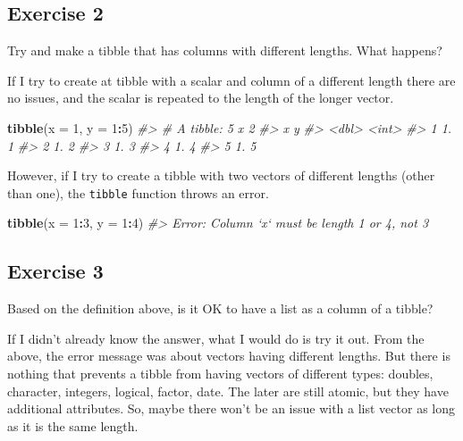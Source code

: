 \documentclass[]{book}
\newenvironment{Shaded}{\begin{snugshade}}{\end{snugshade}}
\newcommand{\CommentTok}[1]{\textcolor[rgb]{0.56,0.35,0.01}{\textit{#1}}}
\newcommand{\DataTypeTok}[1]{\textcolor[rgb]{0.13,0.29,0.53}{#1}}
\newcommand{\DecValTok}[1]{\textcolor[rgb]{0.00,0.00,0.81}{#1}}
\newcommand{\KeywordTok}[1]{\textcolor[rgb]{0.13,0.29,0.53}{\textbf{#1}}}
\newcommand{\NormalTok}[1]{#1}
\newcommand{\OperatorTok}[1]{\textcolor[rgb]{0.81,0.36,0.00}{\textbf{#1}}}
\theoremstyle{definition}
\theoremstyle{definition}
\theoremstyle{definition}
\theoremstyle{remark}
\begin{document}
\hypertarget{exercise-2-50}{%
\subsection{Exercise 2}\label{exercise-2-50}}

Try and make a tibble that has columns with different lengths. What
happens?

If I try to create at tibble with a scalar and column of a different
length there are no issues, and the scalar is repeated to the length of
the longer vector.

\begin{Shaded}
\begin{Highlighting}[]
\KeywordTok{tibble}\NormalTok{(}\DataTypeTok{x =} \DecValTok{1}\NormalTok{, }\DataTypeTok{y =} \DecValTok{1}\OperatorTok{:}\DecValTok{5}\NormalTok{)}
\CommentTok{#> # A tibble: 5 x 2}
\CommentTok{#>       x     y}
\CommentTok{#>   <dbl> <int>}
\CommentTok{#> 1    1.     1}
\CommentTok{#> 2    1.     2}
\CommentTok{#> 3    1.     3}
\CommentTok{#> 4    1.     4}
\CommentTok{#> 5    1.     5}
\end{Highlighting}
\end{Shaded}

However, if I try to create a tibble with two vectors of different
lengths (other than one), the \texttt{tibble} function throws an error.

\begin{Shaded}
\begin{Highlighting}[]
\KeywordTok{tibble}\NormalTok{(}\DataTypeTok{x =} \DecValTok{1}\OperatorTok{:}\DecValTok{3}\NormalTok{, }\DataTypeTok{y =} \DecValTok{1}\OperatorTok{:}\DecValTok{4}\NormalTok{)}
\CommentTok{#> Error: Column `x` must be length 1 or 4, not 3}
\end{Highlighting}
\end{Shaded}

\hypertarget{exercise-3-37}{%
\subsection{Exercise 3}\label{exercise-3-37}}

Based on the definition above, is it OK to have a list as a column of a
tibble?

If I didn't already know the answer, what I would do is try it out. From
the above, the error message was about vectors having different lengths.
But there is nothing that prevents a tibble from having vectors of
different types: doubles, character, integers, logical, factor, date.
The later are still atomic, but they have additional attributes. So,
maybe there won't be an issue with a list vector as long as it is the
same length.
\end{document}
